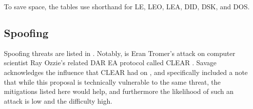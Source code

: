 To save space, the tables use shorthand for \acf{LE}, \acf{LEO}, \acf{LEA}, \acf{DID}, \acf{DSK}, and \acf{DOS}.


\newcommand{\threattablesettings}{\FlushLeft \small}

\newcommand{\threattablebegin}[3]{
  \begin{FlushLeft}
    \small
    \singlespacing
    \begin{longtable}{ lp{3cm}p{5.2cm}p{6cm} }
      \caption{#1 Threats}
      \label{table-#2}
      \\ \toprule
      \thead{ID} & \thead{#3} & \thead{Effect} & \thead{Mitigation}
      \\ \midrule
      \endfirsthead
      \caption[]{#1 Threats (continued)}
      \\
      \toprule
      \thead{ID} & \thead{#3} & \thead{Effect} & \thead{Mitigation}
      \\
      \endhead
      \endfoot
      \bottomrule
      \endlastfoot
}

\newcommand{\threattableend}{
    \end{longtable}
  \end{FlushLeft}
}

\subsection{Spoofing}

Spoofing threats are listed in . Notably,  is Eran Tromer's attack \cite{tromer_2018} on
computer scientist Ray Ozzie's related \ac{DAR} \ac{EA} protocol called CLEAR \cite{ozzie_2018}. Savage acknowledges the
influence that CLEAR had on \ldawmsR, and specifically included a note that while this proposal is technically
vulnerable to the same threat, the mitigations listed here would help, and furthermore the likelihood of such an attack
is low and the difficulty high.

